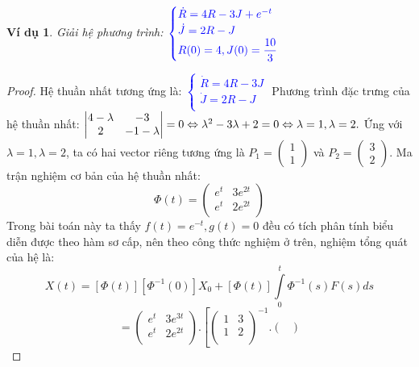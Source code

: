 \documentclass[a4paper]{article}
\newtheorem{example}{Ví dụ}
\begin{document}
\begin{example}
    Giải hệ phương trình: 
    $\textcolor{blue}{
    \begin{cases}
    \dot{R}=4R - 3J + e^{-t}\\
    \dot{J}=2R - J \\
    R(0)=4,J(0)=\dfrac{10}{3}
    \end{cases}
    }$
\end{example}
\begin{proof}
Hệ thuần nhất tương ứng là: \textcolor{blue}{$
    \begin{cases}
    \dot{R}=4R - 3J \\
    \dot{J}=2R - J \\
    \end{cases}
    $}
Phương trình đặc trưng của hệ thuần nhất: 
    $\begin{vmatrix}
4 - \lambda & -3 \\
2 & -1 - \lambda
\end{vmatrix} = 0 \Leftrightarrow \lambda^{2} - 3\lambda + 2 = 0 \Leftrightarrow \lambda = 1, \lambda = 2.\\$
Ứng với $\lambda = 1, \lambda = 2$, ta có hai vector riêng tương ứng là $P_1 = \begin{pmatrix}
    1 \\
    1
\end{pmatrix}$ và $P_2 = \begin{pmatrix}
    3 \\ 
    2
\end{pmatrix}$.
Ma trận nghiệm cơ bản của hệ thuần nhất:
$$\Phi(t) = \begin{pmatrix}
      e^{t} & 3e^{2t} \\
      e^{t} & 2e^{2t} \\ 
 \end{pmatrix}$$
Trong bài toán này ta thấy $f(t) = e^{-t}, g(t) = 0$ đều có tích phân tính biểu diễn được theo hàm sơ cấp, nên theo công thức nghiệm ở trên, nghiệm tổng quát của hệ là: 
$$ X(t) = [\Phi(t)][\Phi^{-1}(0)]X_0+[\Phi(t)]\int\limits_{0}^{t} \Phi^{-1}(s)F(s)ds 
$$
 $$= \begin{pmatrix}
      e^{t} & 3e^{3t} \\
      e^{t} & 2e^{2t} \\ 
 \end{pmatrix}.  \left[ \begin{pmatrix}
     1  & 3  \\
     1  & 2  \\ 
 \end{pmatrix}^{-1}.\begin{pmatrix}

\end{pmatrix}$$
\end{proof}
\end{document}
